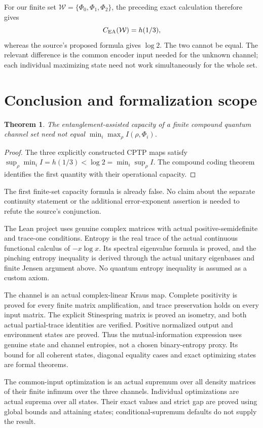 \documentclass[11pt]{article}
\newtheorem{theorem}{Theorem}
\begin{document}
For our finite set $\mathcal W=\{\Phi_0,\Phi_1,\Phi_2\}$,
the preceding exact calculation therefore gives
\[
                   C_{\rm EA}(\mathcal W)=h(1/3),
\]
whereas the source's proposed formula gives $\log2$.
The two cannot be equal. The relevant difference is
the common encoder input needed for the unknown
channel; each individual maximizing state need not
work simultaneously for the whole set.

\newpage
\section*{Conclusion and formalization scope}
\begin{theorem}
The entanglement-assisted capacity of a finite compound
quantum channel set need not equal
$\min_i\max_\rho I(\rho,\Phi_i)$.
\end{theorem}
\begin{proof}
The three explicitly constructed CPTP maps satisfy
$\sup_\rho\min_i I=h(1/3)<\log2=\min_i\sup_\rho I$.
The compound coding theorem identifies the first
quantity with their operational capacity.
\end{proof}
The first finite-set capacity formula is already false.
No claim about the separate continuity statement or
the additional error-exponent assertion is needed to
refute the source's conjunction.

The Lean project uses genuine complex matrices with
actual positive-semidefinite and trace-one conditions.
Entropy is the real trace of the actual continuous
functional calculus of $-x\log x$. Its spectral
eigenvalue formula is proved, and the pinching entropy
inequality is derived through the actual unitary
eigenbases and finite Jensen argument above. No
quantum entropy inequality is assumed as a custom axiom.

The channel is an actual complex-linear Kraus map.
Complete positivity is proved for every finite matrix
amplification, and trace preservation holds on every
input matrix. The explicit Stinespring matrix is proved
an isometry, and both actual partial-trace identities
are verified. Positive normalized output and environment
states are proved. Thus the mutual-information expression
uses genuine state and channel entropies, not a chosen
binary-entropy proxy. Its bound for all coherent states,
diagonal equality cases and exact optimizing states are
formal theorems.

The common-input optimization is an actual supremum
over all density matrices of their finite infimum over
the three channels. Individual optimizations are actual
suprema over all states. Their exact values and strict
gap are proved using global bounds and attaining states;
conditional-supremum defaults do not supply the result.
\end{document}
